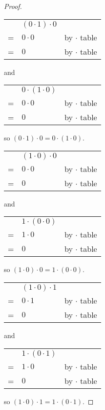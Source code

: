 \documentclass[14pt]{extarticle}
\newcommand{\cy}{\color{cyan}}
\begin{document}
\begin{proof}
  \begin{tabular}{cll}
      & \((0 \cdot 1) \cdot 0\) &                        \\
    = & \(0 \cdot 0\)           & {\cy by $\cdot$ table} \\
    = & \(0\)                   & {\cy by $\cdot$ table}
  \end{tabular}
  and
  \begin{tabular}{cll}
      & \(0 \cdot (1 \cdot 0)\) &                        \\
    = & \(0 \cdot 0\)           & {\cy by $\cdot$ table} \\
    = & \(0\)                   & {\cy by $\cdot$ table}
  \end{tabular}
  so \((0 \cdot 1) \cdot 0 = 0 \cdot (1 \cdot 0)\).

  \begin{tabular}{cll}
      & \((1 \cdot 0) \cdot 0\) &                        \\
    = & \(0 \cdot 0\)           & {\cy by $\cdot$ table} \\
    = & \(0\)                   & {\cy by $\cdot$ table}
  \end{tabular}
  and
  \begin{tabular}{cll}
      & \(1 \cdot (0 \cdot 0)\) &                        \\
    = & \(1 \cdot 0\)           & {\cy by $\cdot$ table} \\
    = & \(0\)                   & {\cy by $\cdot$ table}
  \end{tabular}
  so \((1 \cdot 0) \cdot 0 = 1 \cdot (0 \cdot 0)\).

  \begin{tabular}{cll}
      & \((1 \cdot 0) \cdot 1\) &                        \\
    = & \(0 \cdot 1\)           & {\cy by $\cdot$ table} \\
    = & \(0\)                   & {\cy by $\cdot$ table}
  \end{tabular}
  and
  \begin{tabular}{cll}
      & \(1 \cdot (0 \cdot 1)\) &                        \\
    = & \(1 \cdot 0\)           & {\cy by $\cdot$ table} \\
    = & \(0\)                   & {\cy by $\cdot$ table}
  \end{tabular}
  so \((1 \cdot 0) \cdot 1 = 1 \cdot (0 \cdot 1)\).


\end{proof}
\end{document}
